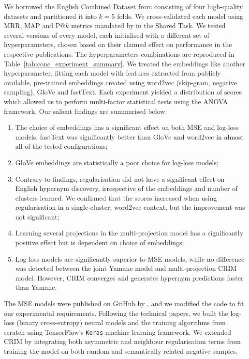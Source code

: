 We borrowed the English Combined Dataset from \citet{ustalov2017negative} consisting of four high-quality datasets and partitioned it into $k=5$ folds.  We cross-validated each model using \ac{MRR}, \ac{MAP} and P$@k$ metrics mandated by \citet{camacho2018semeval} in the Shared Task.  We tested several versions of every model, each initialised with a different set of hyperparameters, chosen based on their claimed effect on performance in the respective publications.  The hyperparameters combinations are reproduced in Table~\ref{tab:conc_experiment_summary}.  We treated the embeddings like another hyperparameter, fitting each model with features extracted from publicly available, pre-trained embeddings created using word2vec (skip-gram, negative sampling), GloVe and fastText.  Each experiment yielded a distribution of scores which allowed us to perform multi-factor statistical tests using the \ac{ANOVA} framework.  Our salient findings are summarised below:
\begin{enumerate}
    \item The choice of embeddings has a significant effect on both \ac{MSE} and log-loss models.  fastText was significantly better than GloVe and word2vec in almost all of the tested configurations;
    \item GloVe embeddings are statistically a poor choice for log-loss models;
    \item Contrary to \citet{ustalov2017negative} findings, regularisation did not have a significant effect on English hypernym discovery, irrespective of the embeddings and number of clusters learned.  We confirmed that the scores increased when using regularisation in a single-cluster, word2vec context, but the improvement was not significant;
    \item Learning several projections in the multi-projection model has a significantly positive effect but is dependent on choice of embeddings;
    \item Log-loss models are significantly superior to \ac{MSE} models, while no difference was detected between the joint Yamane model and multi-projection CRIM model.  However, CRIM converges and generates hypernym predictions faster than Yamane.
\end{enumerate}

The \ac{MSE} models were published on GitHub by \citeauthor{ustalov2017negative}, and we modified the code to fit our experimental requirements.  Following the technical papers, we built the log-loss (binary cross-entropy) neural models and the training algorithms from scratch using TensorFlow's \texttt{Keras} machine learning framework.  We extended CRIM by integrating both asymmetric and neighbour regularisation terms from \citet{ustalov2017negative} training the model on both random and semantically-related negative samples. 

